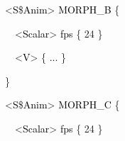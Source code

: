 \documentclass[a4paper]{article}
\newcommand\textstyleOOoComputerKeyWord[1]{\textrm{\textcolor[rgb]{0.0,0.0,0.5019608}{#1}}}
\newcommand\textstyleOOoAssemblerSpecialChar[1]{\textrm{\textcolor[rgb]{0.0,0.5019608,0.0}{#1}}}
\newcommand\textstyleOOoAssemblerIdent[1]{\textrm{\textcolor{black}{#1}}}
\newcommand\textstyleOOoAssemblerLiteral[1]{\textrm{\textcolor[rgb]{0.49803922,0.0,0.49803922}{#1}}}
\begin{document}
{\color{black}
\textstyleOOoComputerKeyWord{\textcolor{black}{\ \ \ \ \ \ }}\textstyleOOoAssemblerSpecialChar{{\textless}}\textstyleOOoAssemblerIdent{S}\textstyleOOoAssemblerSpecialChar{\$}\textstyleOOoAssemblerIdent{Anim}\textstyleOOoAssemblerSpecialChar{{\textgreater}}\textstyleOOoComputerKeyWord{\textcolor{black}{
}}\textstyleOOoAssemblerIdent{MORPH\_B}\textstyleOOoComputerKeyWord{\textcolor{black}{
}}\textstyleOOoAssemblerSpecialChar{\{}}

{\color{black}
\textstyleOOoComputerKeyWord{\textcolor{black}{\ \ \ \ \ \ \ \ }}\textstyleOOoAssemblerSpecialChar{{\textless}}\textstyleOOoAssemblerIdent{Scalar}\textstyleOOoAssemblerSpecialChar{{\textgreater}}\textstyleOOoComputerKeyWord{\textcolor{black}{
}}\textstyleOOoAssemblerIdent{fps}\textstyleOOoComputerKeyWord{\textcolor{black}{
}}\textstyleOOoAssemblerSpecialChar{\{}\textstyleOOoComputerKeyWord{\textcolor{black}{
}}\textstyleOOoAssemblerLiteral{24}\textstyleOOoComputerKeyWord{\textcolor{black}{
}}\textstyleOOoAssemblerSpecialChar{\}}}

{\color{black}
\textstyleOOoComputerKeyWord{\textcolor{black}{\ \ \ \ \ \ \ \ }}\textstyleOOoAssemblerSpecialChar{{\textless}}\textstyleOOoAssemblerIdent{V}\textstyleOOoAssemblerSpecialChar{{\textgreater}}\textstyleOOoComputerKeyWord{\textcolor{black}{
}}\textstyleOOoAssemblerSpecialChar{\{}\textstyleOOoComputerKeyWord{\textcolor{black}{
}}\textstyleOOoAssemblerIdent{...}\textstyleOOoComputerKeyWord{\textcolor{black}{
}}\textstyleOOoAssemblerSpecialChar{\}}}

{\color{black}
\textstyleOOoComputerKeyWord{\textcolor{black}{\ \ \ \ \ \ }}\textstyleOOoAssemblerSpecialChar{\}}}

{\color{black}
\textstyleOOoComputerKeyWord{\textcolor{black}{\ \ \ \ \ \ }}\textstyleOOoAssemblerSpecialChar{{\textless}}\textstyleOOoAssemblerIdent{S}\textstyleOOoAssemblerSpecialChar{\$}\textstyleOOoAssemblerIdent{Anim}\textstyleOOoAssemblerSpecialChar{{\textgreater}}\textstyleOOoComputerKeyWord{\textcolor{black}{
}}\textstyleOOoAssemblerIdent{MORPH\_C}\textstyleOOoComputerKeyWord{\textcolor{black}{
}}\textstyleOOoAssemblerSpecialChar{\{}}

{\color{black}
\textstyleOOoComputerKeyWord{\textcolor{black}{\ \ \ \ \ \ \ \ }}\textstyleOOoAssemblerSpecialChar{{\textless}}\textstyleOOoAssemblerIdent{Scalar}\textstyleOOoAssemblerSpecialChar{{\textgreater}}\textstyleOOoComputerKeyWord{\textcolor{black}{
}}\textstyleOOoAssemblerIdent{fps}\textstyleOOoComputerKeyWord{\textcolor{black}{
}}\textstyleOOoAssemblerSpecialChar{\{}\textstyleOOoComputerKeyWord{\textcolor{black}{
}}\textstyleOOoAssemblerLiteral{24}\textstyleOOoComputerKeyWord{\textcolor{black}{
}}\textstyleOOoAssemblerSpecialChar{\}}}
\end{document}
